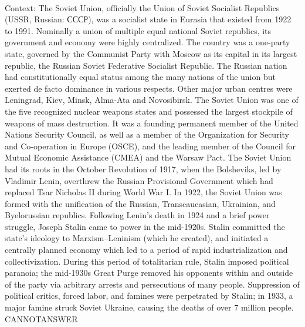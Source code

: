 \documentclass[11pt,a4paper, onecolumn]{article}
\begin{document}
\\ Context: The Soviet Union, officially the Union of Soviet Socialist Republics (USSR, Russian: СССР), was a socialist state in Eurasia that existed from 1922 to 1991. Nominally a union of multiple equal national Soviet republics, its government and economy were highly centralized. The country was a one-party state, governed by the Communist Party with Moscow as its capital in its largest republic, the Russian Soviet Federative Socialist Republic. The Russian nation had constitutionally equal status among the many nations of the union but exerted de facto dominance in various respects. Other major urban centres were Leningrad, Kiev, Minsk, Alma-Ata and Novosibirsk. The Soviet Union was one of the five recognized nuclear weapons states and possessed the largest stockpile of weapons of mass destruction. It was a founding permanent member of the United Nations Security Council, as well as a member of the Organization for Security and Co-operation in Europe (OSCE), and the leading member of the Council for Mutual Economic Assistance (CMEA) and the Warsaw Pact. The Soviet Union had its roots in the October Revolution of 1917, when the Bolsheviks, led by Vladimir Lenin, overthrew the Russian Provisional Government which had replaced Tsar Nicholas II during World War I. In 1922, the Soviet Union was formed with the unification of the Russian, Transcaucasian, Ukrainian, and Byelorussian republics. Following Lenin's death in 1924 and a brief power struggle, Joseph Stalin came to power in the mid-1920s. Stalin committed the state's ideology to Marxism–Leninism (which he created), and initiated a centrally planned economy which led to a period of rapid industrialization and collectivization. During this period of totalitarian rule, Stalin imposed political paranoia; the mid-1930s Great Purge removed his opponents within and outside of the party via arbitrary arrests and persecutions of many people. Suppression of political critics, forced labor, and famines were perpetrated by Stalin; in 1933, a major famine struck Soviet Ukraine, causing the deaths of over 7 million people. CANNOTANSWER
\end{document}
